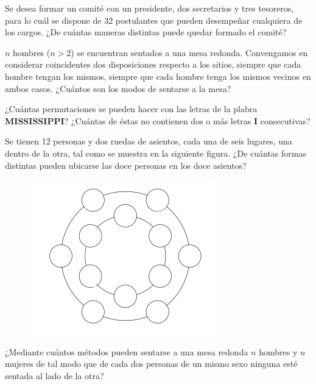 \begin{problema}
Se desea formar un comité con un presidente, dos secretarios y tres tesoreros, para lo cuál
se dispone de 32 postulantes que pueden desempeñar cualquiera de los cargos. ¿De cuántas
maneras distintas puede quedar formado el comité?
\end{problema}

\begin{problema}
$n$ hombres ($n>2$) se encuentran sentados a una mesa redonda. Convengamos en considerar coincidentes dos disposiciones respecto a los sitios, siempre que cada hombre tengan los mismos, siempre que cada hombre tenga los mismos vecinos en ambos casos. ¿Cuántos son los modos de sentarse a la mesa?
\end{problema}

\begin{problema}
¿Cuántas permutaciones se pueden hacer con las letras de la plabra \textbf{MISSISSIPPI}? ¿Cuántas de éstas no contienen dos o más letras \textbf{I} consecutivas?
\end{problema}

\begin{problema}
Se tienen 12 personas y dos ruedas de asientos, cada una de seis lugares, una dentro de la otra, tal como se muestra en la siguiente figura. ¿De cuántas formas distintas pueden ubicarse las doce personas en los doce asientos?

\begin{figure}[h]
    \centering
    \includegraphics[scale=0.5]{Imagenes/Screenshot from 2023-12-07 15-25-24.png}
\end{figure}

\end{problema}

\begin{problema}
¿Mediante cuántos métodos pueden sentarse a una mesa redonda $n$ hombres y $n$ mujeres de tal modo que de cada dos personas de un mismo sexo ninguna esté sentada al lado de la otra?
\end{problema}

